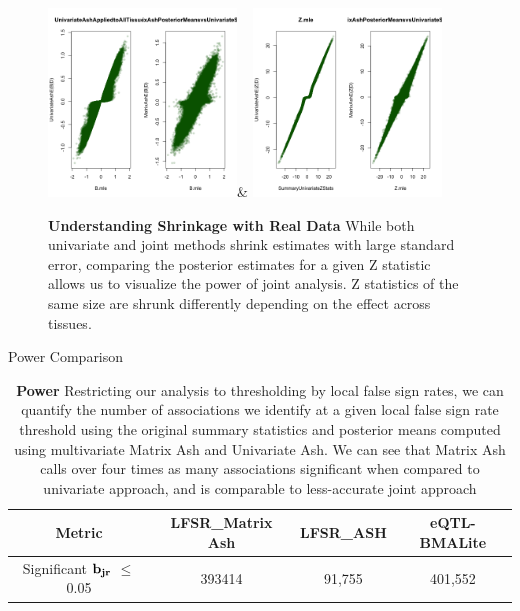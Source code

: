 \begin{figure}[htbp]
\includegraphics[width=5cm]{Figures/comparebeta.png}&
\includegraphics[width=5cm]{Figures/comparez.png}\\
\caption{\textbf{Understanding Shrinkage with Real Data} While both univariate and joint methods shrink estimates with large standard error, comparing the posterior estimates for a given Z statistic allows us to visualize the power of joint analysis. Z statistics of the same size are shrunk differently depending on  the effect across tissues.}
\end{figure}\newline

\begin{table}[ht]
\caption{Power Comparison}
\centering
\begin{tabular}{c c c c}
\hline\hline
Metric & LFSR_{Matrix Ash} & LFSR_{ASH}&eQTL-BMALite \\ [0.5ex] %
\hline
Significant $\bf{b}_{jr}$ $\leq$ 0.05%
&393414 & 91,755&401,552\\
\hline
\end{tabular}
\caption{\textbf{Power} Restricting our analysis to thresholding by local false sign rates, we can quantify the number of associations we identify at a given local false sign rate threshold using the original summary statistics and posterior means computed using multivariate Matrix Ash and Univariate Ash. We can see that Matrix Ash calls over four times as many associations significant when compared to univariate approach, and is comparable to less-accurate joint approach}
\label{table:power}
\end{table}\newline

